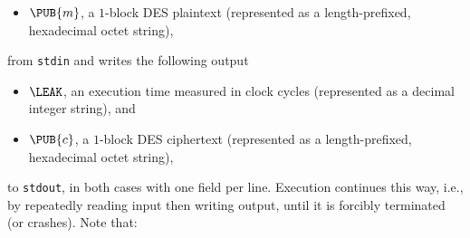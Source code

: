 \documentclass[crop={false},multi={true},tikz={true}]{standalone}
\begin{document}
\begin{itemize}
\item $\PUB{m}$, 
      a  ${1}$-block DES plaintext 
      (represented as a  length-prefixed, hexadecimal octet   string), 
\end{itemize}

\noindent
from \lstinline[language={bash}]{stdin} and writes the following output

\begin{itemize}
\item $\LEAK$,
      an execution time measured in clock cycles
      (represented as a                       decimal integer string),
      and
\item $\PUB{c}$,
      a  ${1}$-block DES ciphertext
      (represented as a  length-prefixed, hexadecimal octet   string), 
\end{itemize}

\noindent
to \lstinline[language={bash}]{stdout}, in both cases with one field per 
line.  Execution continues this way, i.e., by repeatedly reading input 
then writing output, until it is forcibly terminated (or crashes).  
Note that:
\end{document}
